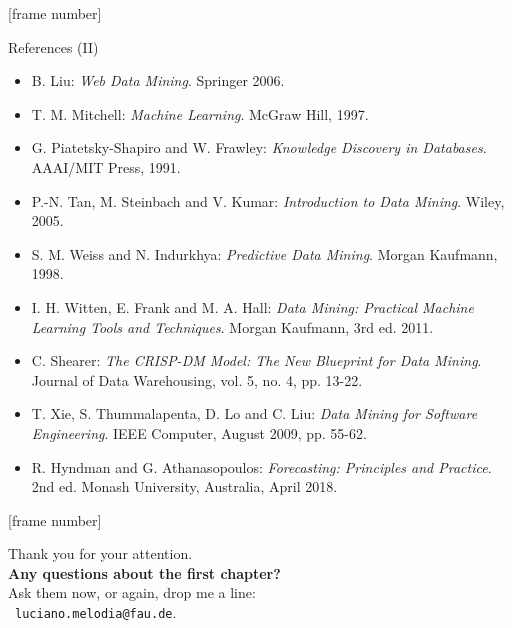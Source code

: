 \documentclass[aspectratio=169,t]{beamer}
\begin{document}
  {
    [frame number]
    \begin{frame}{References (II)}
        \begin{itemize}
          \item B. Liu: \emph{Web Data Mining}. Springer 2006.
          \item T. M. Mitchell: \emph{Machine Learning}. McGraw Hill, 1997.
          \item G. Piatetsky-Shapiro and W. Frawley: \emph{Knowledge Discovery in Databases}. AAAI/MIT Press, 1991.
          \item P.-N. Tan, M. Steinbach and V. Kumar: \emph{Introduction to Data Mining}. Wiley, 2005.
          \item S. M. Weiss and N. Indurkhya: \emph{Predictive Data Mining}. Morgan Kaufmann, 1998.
          \item I. H. Witten, E. Frank and M. A. Hall: \emph{Data Mining: Practical Machine Learning Tools and Techniques}. Morgan Kaufmann, 3rd ed. 2011.
          \item C. Shearer: \emph{The CRISP-DM Model: The New Blueprint for Data Mining}. Journal of Data Warehousing, vol. 5, no. 4, pp. 13-22.
          \item T. Xie, S. Thummalapenta, D. Lo and C. Liu: \emph{Data Mining for Software Engineering}. IEEE Computer, August 2009, pp. 55-62.
          \item R. Hyndman and G. Athanasopoulos: \emph{Forecasting: Principles and Practice}. 2nd ed. Monash University, Australia, April 2018.
        \end{itemize}
    \end{frame}
  }


  { %
    [frame number]
    \begin{frame}[c]
      \begin{center}
        Thank you for your attention.\\
        {\bf Any questions about the first chapter?}\\[0.5cm]
        Ask them now, or again, drop me a line: \\
        \faSendO \ \texttt{luciano.melodia@fau.de}.
      \end{center}
    \end{frame}
  }
\end{document}

